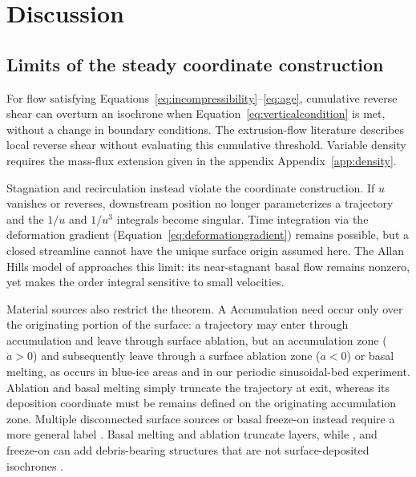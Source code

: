 \documentclass[review]{igs}
\providecommand{\DIFadd}[1]{{\protect\color{blue} \sf #1}} %
\providecommand{\DIFdel}[1]{{\protect\color{red} \scriptsize #1}} %
\providecommand{\DIFaddbegin}{} %
\providecommand{\DIFaddend}{} %
\providecommand{\DIFdelbegin}{} %
\providecommand{\DIFdelend}{} %
\newcommand{\DIFscaledelfig}{0.5}
\newlength{\DIFdelgraphicswidth} %
\newlength{\DIFdelgraphicsheight} %
\newcommand{\DIFaddincludegraphics}[2][]{{\color{blue}\fbox{\DIFOincludegraphics[#1]{#2}}}} %
\newcommand{\DIFdelincludegraphics}[2][]{%
\sbox{\DIFdelgraphicsbox}{\DIFOincludegraphics[#1]{#2}}%
\settoboxwidth{\DIFdelgraphicswidth}{\DIFdelgraphicsbox} %
\settoboxtotalheight{\DIFdelgraphicsheight}{\DIFdelgraphicsbox} %
\scalebox{\DIFscaledelfig}{%
\parbox[b]{\DIFdelgraphicswidth}{\usebox{\DIFdelgraphicsbox}\\[-\baselineskip] \rule{\DIFdelgraphicswidth}{0em}}\llap{\resizebox{\DIFdelgraphicswidth}{\DIFdelgraphicsheight}{%
\setlength{\unitlength}{\DIFdelgraphicswidth}%
\begin{picture}(1,1)%
\thicklines\linethickness{2pt} %
{\color[rgb]{1,0,0}\put(0,0){\framebox(1,1){}}}%
{\color[rgb]{1,0,0}\put(0,0){\line( 1,1){1}}}%
{\color[rgb]{1,0,0}\put(0,1){\line(1,-1){1}}}%
\end{picture}%
}\hspace*{3pt}}} %
} %
\DeclareRobustCommand{\DIFaddbegin}{\DIFOaddbegin \let\includegraphics\DIFaddincludegraphics} %
\DeclareRobustCommand{\DIFaddend}{\DIFOaddend \let\includegraphics\DIFOincludegraphics} %
\DeclareRobustCommand{\DIFdelbegin}{\DIFOdelbegin \let\includegraphics\DIFdelincludegraphics} %
\DeclareRobustCommand{\DIFdelend}{\DIFOaddend \let\includegraphics\DIFOincludegraphics} %
\begin{document}
\section{Discussion}

\subsection{Limits of the steady coordinate construction}

For flow satisfying Equations~\ref{eq:incompressibility}--\ref{eq:age}, cumulative reverse shear can overturn an isochrone when Equation~\ref{eq:verticalcondition} is met, without a change in boundary conditions. The extrusion-flow literature describes local reverse shear without evaluating this cumulative threshold. Variable density requires the mass-flux extension given in \DIFdelbegin \DIFdel{the appendix}\DIFdelend \DIFaddbegin \DIFadd{Appendix~\ref{app:density}}\DIFaddend .

Stagnation and recirculation instead violate the coordinate construction. If \(u\) vanishes or reverses, downstream position no longer parameterizes a trajectory and the \(1/u\) and \(1/u^3\) integrals become singular. Time integration \DIFaddbegin \DIFadd{via the deformation gradient (Equation~\ref{eq:deformationgradient}) }\DIFaddend remains possible, but a closed streamline cannot have the unique surface origin assumed here. The Allan Hills model of \citet{Manos2026} approaches this limit: its near-stagnant basal flow remains nonzero, yet makes the order integral sensitive to small velocities.

Material sources also restrict the theorem. \DIFdelbegin \DIFdel{A }\DIFdelend \DIFaddbegin \DIFadd{Accumulation need occur only over the originating portion of the surface: a }\DIFaddend trajectory may enter through \DIFdelbegin \DIFdel{accumulation and leave through surface ablation, but }\DIFdelend \DIFaddbegin \DIFadd{an accumulation zone (\(\dot a>0\)) and subsequently leave through a surface ablation zone (\(\dot a<0\)) or basal melting, as occurs in blue-ice areas and in our periodic sinusoidal-bed experiment. Ablation and basal melting simply truncate the trajectory at exit, whereas }\DIFaddend its deposition coordinate \DIFdelbegin \DIFdel{must be }\DIFdelend \DIFaddbegin \DIFadd{remains }\DIFaddend defined on the originating accumulation zone. Multiple \DIFaddbegin \DIFadd{disconnected }\DIFaddend surface sources or basal freeze-on \DIFaddbegin \DIFadd{instead }\DIFaddend require a more general label\DIFdelbegin \DIFdel{. Basal melting and ablation truncate layers, while }\DIFdelend \DIFaddbegin \DIFadd{, and }\DIFaddend freeze-on can add debris-bearing structures that are not surface-deposited isochrones \citep{LeysingerVieli2018,Holschuh2026}.
\end{document}
